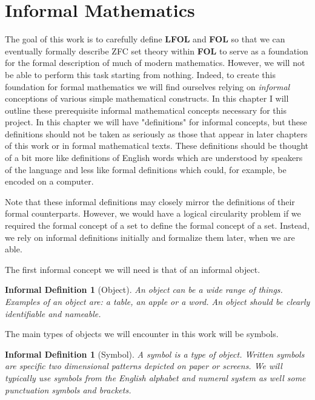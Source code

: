 \documentclass[12pt]{article}
\theoremstyle{break}
\theoremstyle{break}
\theoremstyle{break}
\theoremstyle{break}
\theoremstyle{break}
\newtheorem{informal definition}[definition]{Informal Definition}
\begin{document}
\newpage
\section{Informal Mathematics}
The goal of this work is to carefully define \textbf{LFOL} and \textbf{FOL} so that we can eventually formally describe ZFC set theory within \textbf{FOL} to serve as a foundation for the formal description of much of modern mathematics.
However, we will not be able to perform this task starting from nothing.
Indeed, to create this foundation for formal mathematics we will find ourselves relying on \textit{informal} conceptions of various simple mathematical constructs.
In this chapter I will outline these prerequisite informal mathematical concepts necessary for this project.
In this chapter we will have "definitions" for informal concepts, but these definitions should not be taken as seriously as those that appear in later chapters of this work or in formal mathematical texts.
These definitions should be thought of a bit more like definitions of English words which are understood by speakers of the language and less like formal definitions which could, for example, be encoded on a computer.

Note that these informal definitions may closely mirror the definitions of their formal counterparts.
However, we would have a logical circularity problem if we required the formal concept of a set to define the formal concept of a set.
Instead, we rely on informal definitions initially and formalize them later, when we are able.

The first informal concept we will need is that of an informal object.
\begin{informal definition}[Object]
An object can be a wide range of things.
Examples of an object are: a table, an apple or a word.
An object should be clearly identifiable and nameable.
\end{informal definition}

The main types of objects we will encounter in this work will be symbols.
\begin{informal definition}[Symbol]
A symbol is a type of object.
Written symbols are specific two dimensional patterns depicted on paper or screens.
We will typically use symbols from the English alphabet and numeral system as well some punctuation symbols and brackets.
\end{informal definition}
\end{document}
